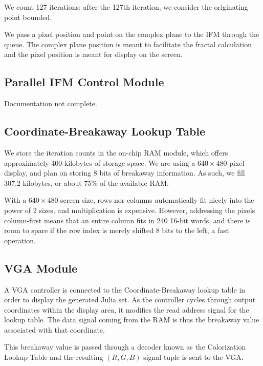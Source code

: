 \documentclass{article}
\begin{document}
We count 127 iterations: after the 127th iteration, we consider the
originating point bounded.

We pass a pixel position and point on the complex plane to the IFM
through the queue. The complex plane position is meant to
facilitate the fractal calculation and the pixel position is meant for
display on the screen.



\subsection{Parallel IFM Control Module}

Documentation not complete.

\subsection{Coordinate-Breakaway Lookup Table}

We store the iteration counts in the on-chip RAM module, which offers
approximately 400 kilobytes of storage space.  We are using a $640
\times 480$ pixel display, and plan on storing 8 bits of breakaway
information. As such, we fill 307.2 kilobytes, or about 75\% of the
available RAM.

With a $640 \times 480$ screen size, rows nor columns automatically fit
nicely into the power of 2 sizes, and multiplication is
expensive. However, addressing the pixels column-first means that an
entire column fits in 240 16-bit words, and there is room to spare if
the row index is merely shifted 8 bits to the left, a fast operation.



\subsection{VGA Module}

A VGA controller is connected to the Coordinate-Breakaway lookup table
in order to display the generated Julia set. As the controller cycles
through output coordinates within the display area, it modifies the
read address signal for the lookup table. The data signal coming from
the RAM is thus the breakaway value associated with that coordinate.

This breakaway value is passed through a decoder known as the
Colorization Lookup Table and the resulting $(R, G, B)$ signal tuple
is sent to the VGA.
\end{document}
